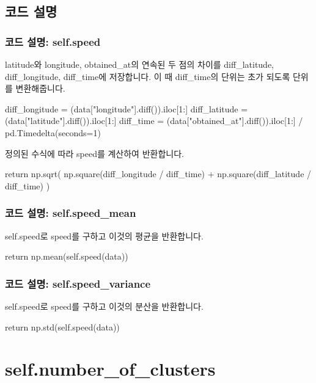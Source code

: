 \documentclass{oblivoir}
\begin{document}
  \subsection{코드 설명}
  \subsubsection{코드 설명: self.speed}
  latitude와 longitude, obtained\_at의 연속된 두 점의 차이를 diff\_latitude, diff\_longitude, diff\_time에 저장합니다.
  이 때 diff\_time의 단위는 초가 되도록 단위를 변환해줍니다.
  \begin{python}[label={GPS_featue_8}]
    diff_longitude = (data["longitude"].diff()).iloc[1:]
    diff_latitude = (data["latitude"].diff()).iloc[1:]
    diff_time = (data["obtained_at"].diff()).iloc[1:] / pd.Timedelta(seconds=1)
  \end{python}
  정의된 수식에 따라 speed를 계산하여 반환합니다.
  \begin{python}[label={GPS_feature_9}]
    return np.sqrt(
      np.square(diff_longitude / diff_time) + np.square(diff_latitude / diff_time)
    )
  \end{python}

  \subsubsection{코드 설명: self.speed\_mean}
  self.speed로 speed를 구하고 이것의 평균을 반환합니다.
  \begin{python}[label={GPS_feature_10}]
    return np.mean(self.speed(data))
  \end{python}

  \subsubsection{코드 설명: self.speed\_variance}
  self.speed로 speed를 구하고 이것의 분산을 반환합니다.
  \begin{python}[label={GPS_feature_11}]
    return np.std(self.speed(data))
  \end{python}

  \section{self.number\_of\_clusters}
\end{document}
